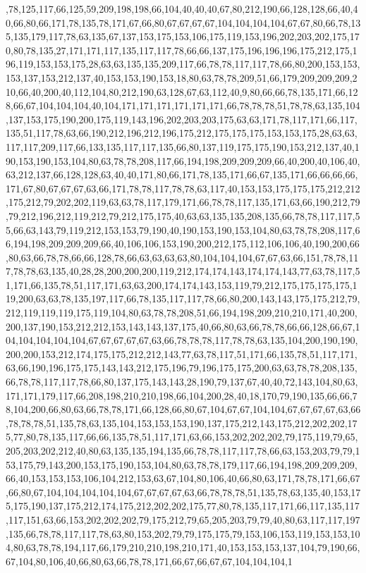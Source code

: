 ,78,125,117,66,125,59,209,198,198,66,104,40,40,40,67,80,212,190,66,128,128,66,40,40,66,80,66,171,78,135,78,171,67,66,80,67,67,67,67,104,104,104,104,67,67,80,66,78,135,135,179,117,78,63,135,67,137,153,175,153,106,175,119,153,196,202,203,202,175,170,80,78,135,27,171,171,117,135,117,117,78,66,66,137,175,196,196,196,175,212,175,196,119,153,153,175,28,63,63,135,135,209,117,66,78,78,117,117,78,66,80,200,153,153,153,137,153,212,137,40,153,153,190,153,18,80,63,78,78,209,51,66,179,209,209,209,210,66,40,200,40,112,104,80,212,190,63,128,67,63,112,40,9,80,66,66,78,135,171,66,128,66,67,104,104,104,40,104,171,171,171,171,171,171,66,78,78,78,51,78,78,63,135,104,137,153,175,190,200,175,119,143,196,202,203,203,175,63,63,171,78,117,171,66,117,135,51,117,78,63,66,190,212,196,212,196,175,212,175,175,175,153,153,175,28,63,63,117,117,209,117,66,133,135,117,117,135,66,80,137,119,175,175,190,153,212,137,40,190,153,190,153,104,80,63,78,78,208,117,66,194,198,209,209,209,66,40,200,40,106,40,63,212,137,66,128,128,63,40,40,171,80,66,171,78,135,171,66,67,135,171,66,66,66,66,171,67,80,67,67,67,63,66,171,78,78,117,78,78,63,117,40,153,153,175,175,175,212,212,175,212,79,202,202,119,63,63,78,117,179,171,66,78,78,117,135,171,63,66,190,212,79,79,212,196,212,119,212,79,212,175,175,40,63,63,135,135,208,135,66,78,78,117,117,55,66,63,143,79,119,212,153,153,79,190,40,190,153,190,153,104,80,63,78,78,208,117,66,194,198,209,209,209,66,40,106,106,153,190,200,212,175,112,106,106,40,190,200,66,80,63,66,78,78,66,66,128,78,66,63,63,63,63,80,104,104,104,67,67,63,66,151,78,78,117,78,78,63,135,40,28,28,200,200,200,119,212,174,174,143,174,174,143,77,63,78,117,51,171,66,135,78,51,117,171,63,63,200,174,174,143,153,119,79,212,175,175,175,175,119,200,63,63,78,135,197,117,66,78,135,117,117,78,66,80,200,143,143,175,175,212,79,212,119,119,119,175,119,104,80,63,78,78,208,51,66,194,198,209,210,210,171,40,200,200,137,190,153,212,212,153,143,143,137,175,40,66,80,63,66,78,78,66,66,128,66,67,104,104,104,104,104,67,67,67,67,67,63,66,78,78,78,117,78,78,63,135,104,200,190,190,200,200,153,212,174,175,175,212,212,143,77,63,78,117,51,171,66,135,78,51,117,171,63,66,190,196,175,175,143,143,212,175,196,79,196,175,175,200,63,63,78,78,208,135,66,78,78,117,117,78,66,80,137,175,143,143,28,190,79,137,67,40,40,72,143,104,80,63,171,171,179,117,66,208,198,210,210,198,66,104,200,28,40,18,170,79,190,135,66,66,78,104,200,66,80,63,66,78,78,171,66,128,66,80,67,104,67,67,104,104,67,67,67,67,63,66,78,78,78,51,135,78,63,135,104,153,153,153,190,137,175,212,143,175,212,202,202,175,77,80,78,135,117,66,66,135,78,51,117,171,63,66,153,202,202,202,79,175,119,79,65,205,203,202,212,40,80,63,135,135,194,135,66,78,78,117,117,78,66,63,153,203,79,79,153,175,79,143,200,153,175,190,153,104,80,63,78,78,179,117,66,194,198,209,209,209,66,40,153,153,153,106,104,212,153,63,67,104,80,106,40,66,80,63,171,78,78,171,66,67,66,80,67,104,104,104,104,104,67,67,67,67,63,66,78,78,78,51,135,78,63,135,40,153,175,175,190,137,175,212,174,175,212,202,202,175,77,80,78,135,117,171,66,117,135,117,117,151,63,66,153,202,202,202,79,175,212,79,65,205,203,79,79,40,80,63,117,117,197,135,66,78,78,117,117,78,63,80,153,202,79,79,175,175,79,153,106,153,119,153,153,104,80,63,78,78,194,117,66,179,210,210,198,210,171,40,153,153,153,137,104,79,190,66,67,104,80,106,40,66,80,63,66,78,78,171,66,67,66,67,67,104,104,104,1